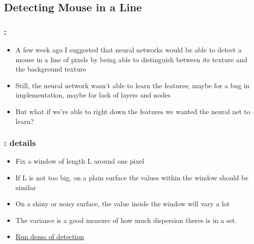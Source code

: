 \documentclass{beamer}
\begin{document}
\subsection{Detecting Mouse in a Line}
\begin{frame}
  \frametitle{\secname: \subsecname}
  \begin{itemize}
      \item A few week ago I suggested that neural networks would be able to detect a mouse in a line of pixels by being
        able to distinguish between its texture and the background texture
      \item Still, the neural network wasn't able to learn the features; maybe for a bug in implementation, maybe for
        lack of layers and nodes
      \item But what if we're able to right down the features we wanted the neural net to learn?
  \end{itemize}
\end{frame}

\begin{frame}
  \frametitle{\subsecname : details}
  \begin{itemize}
      \item Fix a window of length L around one pixel
      \item If L is not too big, on a plain surface the values within the window should be similar
      \item On a shiny or noisy surface, the value inside the window will vary a lot
      \item The variance is a good measure of how much dispersion theres is in a set.
      \item \href{run:runLineDetect.sh}{Run demo of detection}
  \end{itemize}
\end{frame}
\end{document}
